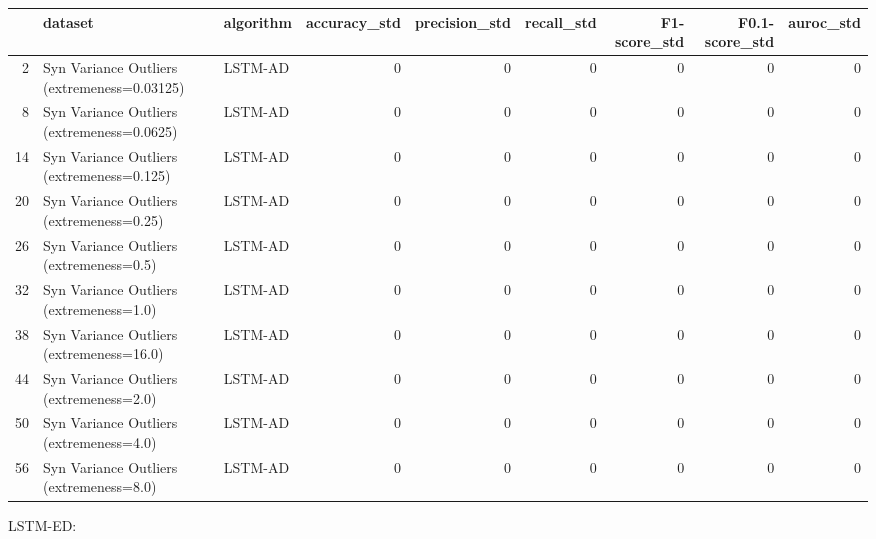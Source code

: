 \begin{tabular}{rllrrrrrr}
\hline
    & dataset                                     & algorithm   &   accuracy\_std &   precision\_std &   recall\_std &   F1-score\_std &   F0.1-score\_std &   auroc\_std \\
\hline
  2 & Syn Variance Outliers (extremeness=0.03125) & LSTM-AD     &              0 &               0 &            0 &              0 &                0 &           0 \\
  8 & Syn Variance Outliers (extremeness=0.0625)  & LSTM-AD     &              0 &               0 &            0 &              0 &                0 &           0 \\
 14 & Syn Variance Outliers (extremeness=0.125)   & LSTM-AD     &              0 &               0 &            0 &              0 &                0 &           0 \\
 20 & Syn Variance Outliers (extremeness=0.25)    & LSTM-AD     &              0 &               0 &            0 &              0 &                0 &           0 \\
 26 & Syn Variance Outliers (extremeness=0.5)     & LSTM-AD     &              0 &               0 &            0 &              0 &                0 &           0 \\
 32 & Syn Variance Outliers (extremeness=1.0)     & LSTM-AD     &              0 &               0 &            0 &              0 &                0 &           0 \\
 38 & Syn Variance Outliers (extremeness=16.0)    & LSTM-AD     &              0 &               0 &            0 &              0 &                0 &           0 \\
 44 & Syn Variance Outliers (extremeness=2.0)     & LSTM-AD     &              0 &               0 &            0 &              0 &                0 &           0 \\
 50 & Syn Variance Outliers (extremeness=4.0)     & LSTM-AD     &              0 &               0 &            0 &              0 &                0 &           0 \\
 56 & Syn Variance Outliers (extremeness=8.0)     & LSTM-AD     &              0 &               0 &            0 &              0 &                0 &           0 \\
\hline
\end{tabular}

LSTM-ED:


